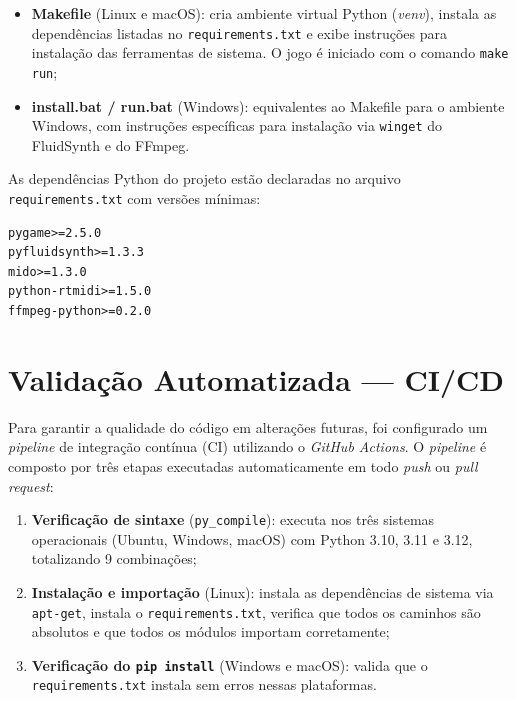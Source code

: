 \documentclass[
  12pt,
  openright,
  twoside,
  a4paper,
  english,
  brazil
]{abntex2}
\begin{document}
\begin{itemize}
  \item \textbf{Makefile} (Linux e macOS): cria ambiente virtual Python
        (\textit{venv}), instala as dependências listadas no
        \texttt{requirements.txt} e exibe instruções para instalação das
        ferramentas de sistema. O jogo é iniciado com o comando
        \texttt{make run};
  \item \textbf{install.bat / run.bat} (Windows): equivalentes ao
        Makefile para o ambiente Windows, com instruções específicas para
        instalação via \texttt{winget} do FluidSynth e do FFmpeg.
\end{itemize}

As dependências Python do projeto estão declaradas no arquivo
\texttt{requirements.txt} com versões mínimas:

\begin{lstlisting}[caption={requirements.txt do projeto MIDI Hero.},
                   label={lst:requirements},language={}]
pygame>=2.5.0
pyfluidsynth>=1.3.3
mido>=1.3.0
python-rtmidi>=1.5.0
ffmpeg-python>=0.2.0
\end{lstlisting}

\section{Validação Automatizada --- CI/CD}

Para garantir a qualidade do código em alterações futuras, foi
configurado um \textit{pipeline} de integração contínua (CI) utilizando
o \textit{GitHub Actions}. O \textit{pipeline} é composto por três
etapas executadas automaticamente em todo \textit{push} ou
\textit{pull request}:

\begin{enumerate}
  \item \textbf{Verificação de sintaxe} (\texttt{py\_compile}): executa
        nos três sistemas operacionais (Ubuntu, Windows, macOS) com
        Python 3.10, 3.11 e 3.12, totalizando 9 combinações;
  \item \textbf{Instalação e importação} (Linux): instala as
        dependências de sistema via \texttt{apt-get}, instala o
        \texttt{requirements.txt}, verifica que todos os caminhos são
        absolutos e que todos os módulos importam corretamente;
  \item \textbf{Verificação do \texttt{pip install}} (Windows e macOS):
        valida que o \texttt{requirements.txt} instala sem erros nessas
        plataformas.
\end{enumerate}
\end{document}
